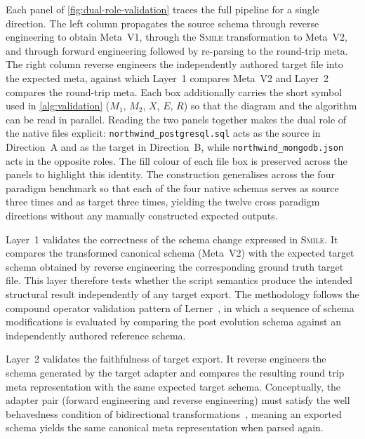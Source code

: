   Each panel of \autoref{fig:dual-role-validation} traces the full pipeline
  for a single direction. The left column propagates the source schema
  through reverse engineering to obtain Meta~V1, through the \textsc{Smile}
  transformation to Meta~V2, and through forward engineering followed
  by re-parsing to the round-trip meta. The right column reverse engineers
  the independently authored target file into the expected meta, against
  which Layer~1 compares Meta~V2 and Layer~2 compares the round-trip meta.
  Each box additionally carries the short symbol used in
  \autoref{alg:validation} ($M_1$, $M_2$, $X$, $E$, $R$) so that the
  diagram and the algorithm can be read in parallel. Reading the two
  panels together makes the dual role of the native files explicit:
  \texttt{northwind\_postgresql.sql} acts as the source in Direction~A
  and as the target in Direction~B, while \texttt{northwind\_mongodb.json}
  acts in the opposite roles. The fill colour of each file box is
  preserved across the panels to highlight this identity. The
  construction generalises across the four paradigm benchmark so that
  each of the four native schemas serves as source three times and as
  target three times, yielding the twelve cross paradigm directions
  without any manually constructed expected outputs.

  Layer~1 validates the correctness of the schema change expressed in
  \textsc{Smile}. It compares the transformed canonical schema (Meta~V2)
  with the expected target schema obtained by reverse engineering the
  corresponding ground truth target file. This layer therefore tests whether
  the script semantics produce the intended structural result independently
  of any target export. The methodology follows the compound operator
  validation pattern of Lerner~\cite{lerner2000model}, in which a sequence
  of schema modifications is evaluated by comparing the post evolution
  schema against an independently authored reference schema.

  Layer~2 validates the faithfulness of target export. It reverse engineers
  the schema generated by the target adapter and compares the resulting
  round trip meta representation with the same expected target schema.
  Conceptually, the adapter pair (forward engineering and reverse
  engineering) must satisfy the well behavedness condition of bidirectional
  transformations~\cite{foster2007combinators}, meaning an exported schema
  yields the same canonical meta representation when parsed again.


